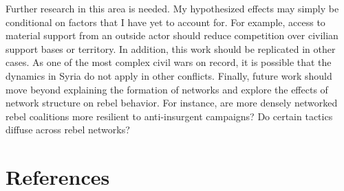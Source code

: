 \documentclass[12pt,]{book}
\begin{document}
Further research in this area is needed. My hypothesized effects may
simply be conditional on factors that I have yet to account for. For
example, access to material support from an outside actor should reduce
competition over civilian support bases or territory. In addition, this
work should be replicated in other cases. As one of the most complex
civil wars on record, it is possible that the dynamics in Syria do not
apply in other conflicts. Finally, future work should move beyond
explaining the formation of networks and explore the effects of network
structure on rebel behavior. For instance, are more densely networked
rebel coalitions more resilient to anti-insurgent campaigns? Do certain
tactics diffuse across rebel networks?

\chapter*{References}\label{references}

\indent

\setlength{\parindent}{-0.2in} \setlength{\leftskip}{0.2in}
\setlength{\parskip}{8pt}

\singlespacing


\end{document}
